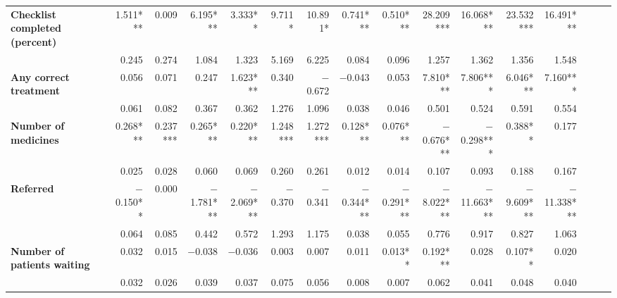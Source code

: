 \begin{tabular}{@{\extracolsep{5pt}}lrrrrrrrrrrrrrrr}
{\bf Checklist completed (percent)} & 1.511*** & 0.009\phantom{***} & 6.195*** & 3.333**\phantom{*} & 9.711*\phantom{**} & 10.891*\phantom{**} & 0.741*** & 0.510*** & 28.209*** & 16.068*** & 23.532*** & 16.491*** \\
{\bf } & 0.245\phantom{***} & 0.274\phantom{***} & 1.084\phantom{***} & 1.323\phantom{***} & 5.169\phantom{***} & 6.225\phantom{***} & 0.084\phantom{***} & 0.096\phantom{***} & 1.257\phantom{***} & 1.362\phantom{***} & 1.356\phantom{***} & 1.548\phantom{***} \\
{\bf Any correct treatment} & 0.056\phantom{***} & 0.071\phantom{***} & 0.247\phantom{***} & 1.623*** & 0.340\phantom{***} & $-$0.672\phantom{***} & $-$0.043\phantom{***} & 0.053\phantom{***} & 7.810*** & 7.806*** & 6.046*** & 7.160*** \\
{\bf } & 0.061\phantom{***} & 0.082\phantom{***} & 0.367\phantom{***} & 0.362\phantom{***} & 1.276\phantom{***} & 1.096\phantom{***} & 0.038\phantom{***} & 0.046\phantom{***} & 0.501\phantom{***} & 0.524\phantom{***} & 0.591\phantom{***} & 0.554\phantom{***} \\
{\bf Number of medicines} & 0.268*** & 0.237*** & 0.265*** & 0.220*** & 1.248*** & 1.272*** & 0.128*** & 0.076*** & $-$0.676*** & $-$0.298*** & 0.388**\phantom{*} & 0.177\phantom{***} \\
{\bf } & 0.025\phantom{***} & 0.028\phantom{***} & 0.060\phantom{***} & 0.069\phantom{***} & 0.260\phantom{***} & 0.261\phantom{***} & 0.012\phantom{***} & 0.014\phantom{***} & 0.107\phantom{***} & 0.093\phantom{***} & 0.188\phantom{***} & 0.167\phantom{***} \\
{\bf Referred} & $-$0.150**\phantom{*} & 0.000\phantom{***} & $-$1.781*** & $-$2.069*** & $-$0.370\phantom{***} & $-$0.341\phantom{***} & $-$0.344*** & $-$0.291*** & $-$8.022*** & $-$11.663*** & $-$9.609*** & $-$11.338*** \\
{\bf } & 0.064\phantom{***} & 0.085\phantom{***} & 0.442\phantom{***} & 0.572\phantom{***} & 1.293\phantom{***} & 1.175\phantom{***} & 0.038\phantom{***} & 0.055\phantom{***} & 0.776\phantom{***} & 0.917\phantom{***} & 0.827\phantom{***} & 1.063\phantom{***} \\
{\bf Number of patients waiting} & 0.032\phantom{***} & 0.015\phantom{***} & $-$0.038\phantom{***} & $-$0.036\phantom{***} & 0.003\phantom{***} & 0.007\phantom{***} & 0.011\phantom{***} & 0.013**\phantom{*} & 0.192*** & 0.028\phantom{***} & 0.107**\phantom{*} & 0.020\phantom{***} \\
{\bf } & 0.032\phantom{***} & 0.026\phantom{***} & 0.039\phantom{***} & 0.037\phantom{***} & 0.075\phantom{***} & 0.056\phantom{***} & 0.008\phantom{***} & 0.007\phantom{***} & 0.062\phantom{***} & 0.041\phantom{***} & 0.048\phantom{***} & 0.040\phantom{***} \\

\end{tabular}
